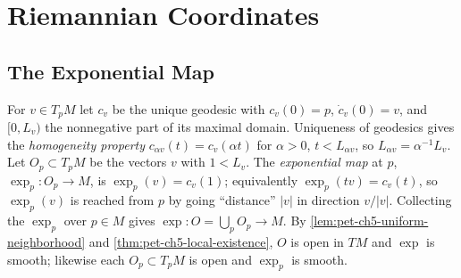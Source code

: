 \section{Riemannian Coordinates}

\subsection{The Exponential Map}

\begin{definition}
  \label{def:pet-ch5-exponential-map}
  \leanok
  For $v\in T_pM$ let $c_v$ be the unique geodesic with $c_v(0)=p$, $\dot c_v(0)=v$,
  and $[0,L_v)$ the nonnegative part of its maximal domain. Uniqueness of geodesics
  gives the \emph{homogeneity property} $c_{\alpha v}(t)=c_v(\alpha t)$ for
  $\alpha>0$, $t<L_{\alpha v}$, so $L_{\alpha v}=\alpha^{-1}L_v$. Let $O_p\subset
  T_pM$ be the vectors $v$ with $1<L_v$. The \emph{exponential map} at $p$,
  $\exp_p:O_p\to M$, is $\exp_p(v)=c_v(1)$; equivalently $\exp_p(tv)=c_v(t)$, so
  $\exp_p(v)$ is reached from $p$ by going ``distance'' $|v|$ in direction $v/|v|$.
  Collecting the $\exp_p$ over $p\in M$ gives $\exp:O=\bigcup_pO_p\to M$. By
  \cref{lem:pet-ch5-uniform-neighborhood} and
  \cref{thm:pet-ch5-local-existence}, $O$ is open in
  $TM$ and $\exp$ is smooth; likewise each $O_p\subset T_pM$ is open and $\exp_p$ is
  smooth.
\end{definition}

